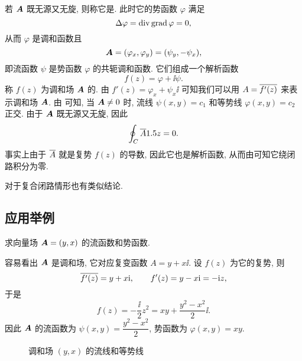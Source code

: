 若 ${\boldsymbol{A}}$ 既无源又无旋, 则称它是.
此时它的势函数 $\varphi$ 满足
\[
  \Delta \varphi=\operatorname{div}\operatorname{grad}\varphi=0,
\]
从而 $\varphi$ 是调和函数且
\[
  {\boldsymbol{A}}=(\varphi_x,\varphi_y)
  =(\psi_y,-\psi_x),
\]
即流函数 $\psi$ 是势函数 $\varphi$ 的共轭调和函数.
它们组成一个解析函数
\[
  f(z)=\varphi+\ii\psi.
\]
称 $f(z)$ 为调和场 ${\boldsymbol{A}}$ 的.
由 $f'(z)=\varphi_x+\psi_x\ii$ 可知我们可以用 $A=\overline{f'(z)}$ 来表示调和场 ${\boldsymbol{A}}$.
由 可知, 当 ${\boldsymbol{A}}\neq 0$ 时, 流线 $\psi(x,y)=c_1$ 和等势线 $\varphi(x,y)=c_2$ 正交.
由于 ${\boldsymbol{A}}$ 既无源又无旋, 因此
\[
  \oint_C \overline A1.5 z=0.
\]
事实上由于 $\overline A$ 就是复势 $f(z)$ 的导数, 因此它也是解析函数, 从而由\thmCG 可知它绕闭路积分为零.

对于复合闭路情形也有类似结论.


\subsection{应用举例}

\begin{example}
  求向量场 ${\boldsymbol{A}}=(y,x)$ 的流函数和势函数.
\end{example}
\begin{solution}
  容易看出 ${\boldsymbol{A}}$ 是调和场, 它对应复变函数 $A=y+x\ii$.
  设 $f(z)$ 为它的复势, 则
  \[
    \overline{f'(z)}=y+x\mathrm{i},\qquad
    f'(z)=y-x\mathrm{i}=-\mathrm{i} z,
  \]
  于是
  \[
    f(z)=-\frac\ii2z^2
    =xy+\frac{y^2-x^2}2\ii.
  \]
  因此 ${\boldsymbol{A}}$ 的流函数为 $\psi(x,y)=\dfrac{y^2-x^2}2$, 势函数为 $\varphi(x,y)=xy$.
\end{solution}

\begin{figure}[H]
  \centering
  \caption{调和场 $(y,x)$ 的流线和等势线}
\end{figure}


